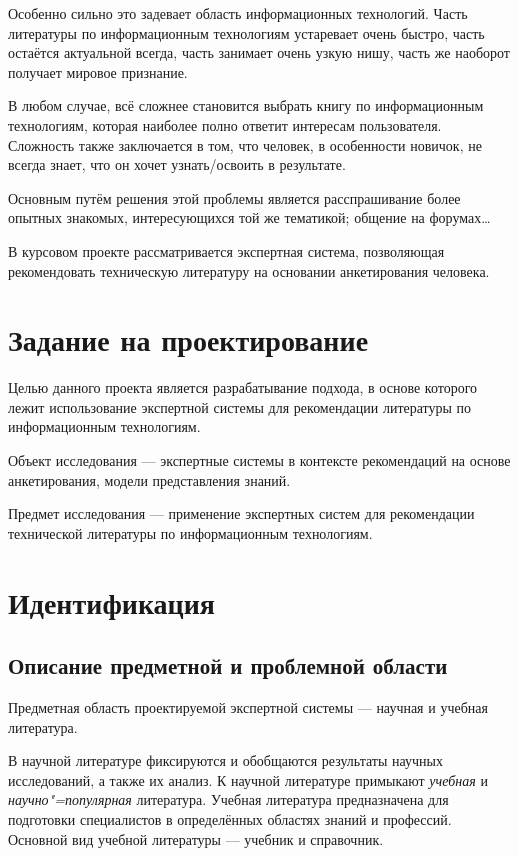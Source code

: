 \documentclass[simple,14pt,utf8,russian]{eskdtext}
\begin{document}
    Особенно сильно это задевает область информационных технологий.
    Часть литературы по информационным технологиям устаревает очень быстро, часть остаётся актуальной всегда, часть
    занимает очень узкую нишу, часть же наоборот получает мировое признание.

    В любом случае, всё сложнее становится выбрать книгу по информационным технологиям, которая наиболее полно ответит
    интересам пользователя.
    Сложность также заключается в том, что человек, в особенности новичок, не всегда знает, что он хочет
    узнать/освоить в результате.~\cite{book2}

    Основным путём решения этой проблемы является расспрашивание более опытных знакомых, интересующихся той же
    тематикой; общение на форумах\dots

    В курсовом проекте рассматривается экспертная система, позволяющая рекомендовать техническую литературу на
    основании анкетирования человека.
    \clearpage
\section{Задание на проектирование}
\label{chap:task}
    Целью данного проекта является разрабатывание подхода, в основе которого лежит использование экспертной системы
    для рекомендации литературы по информационным технологиям.

    Объект исследования --- экспертные системы в контексте рекомендаций на основе анкетирования, модели представления
    знаний.

    Предмет исследования --- применение экспертных систем для рекомендации технической литературы по информационным
    технологиям.
    \clearpage
\section{Идентификация}
\label{chap:identitication}
    \subsection{Описание предметной и проблемной области}
    \label{sec:description}
    Предметная область проектируемой экспертной системы --- научная и учебная литература.

    В научной литературе фиксируются и обобщаются результаты научных исследований, а также их анализ.
    К научной литературе примыкают \textit{учебная} и \textit{научно"=популярная} литература.
    Учебная литература предназначена для подготовки специалистов в определённых областях знаний и профессий.
    Основной вид учебной литературы --- учебник и справочник.
\end{document}
